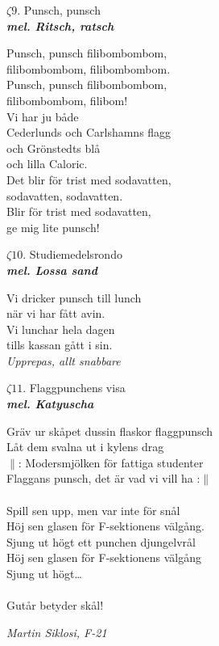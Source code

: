 \documentclass[a6paper,10pt]{article}
\newcommand{\mel}[1]{\small\textbf{\textit{mel. #1 \\}}}
\begin{document}
\begin{center}
\Large $\zeta9$. Punsch, punsch \\ 
\mel{Ritsch, ratsch}
\end{center}
Punsch, punsch filibombombom,\\
filibombombom, filibombombom.\\
Punsch, punsch filibombombom,\\
filibombombom, filibom!
\vspace{5pt}\\
Vi har ju både \\
Cederlunds och Carlshamns flagg\\
och Grönstedts blå\\
och lilla Caloric.\\
Det blir för trist med sodavatten,\\
sodavatten, sodavatten.\\
Blir för trist med sodavatten,\\
ge mig lite punsch!

\setlength{\oddsidemargin}{-0.37in}
\noindent

\begin{center}
\Large $\zeta10$. Studiemedelsrondo \\ 
\mel{Lossa sand}
\end{center}
Vi dricker punsch till lunch\\
när vi har fått avin.\\
Vi lunchar hela dagen\\
tills kassan gått i sin.
\vspace{10pt}\\
\textit{Upprepas, allt snabbare}
\vspace{40pt}
\begin{center}
\Large $\zeta11$. Flaggpunchens visa \\ 
\mel{Katyuscha}
\end{center}
Gräv ur skåpet dussin flaskor flaggpunsch\\
Låt dem svalna ut i kylens drag \\
$\|$: Modersmjölken för fattiga studenter\\
Flaggans punsch, det är vad vi vill ha :$\|$\\
\vspace{5pt}\\
Spill sen upp, men var inte för snål\\
Höj sen glasen för F-sektionens välgång.\\
Sjung ut högt ett punchen djungelvrål\\
Höj sen glasen för F-sektionens välgång\\
Sjung ut högt…\\
\vspace{5pt}\\
Gutår betyder skål!
\begin{flushright}
\textit{Martin Siklosi, F-21}
\end{flushright}
\end{document}
